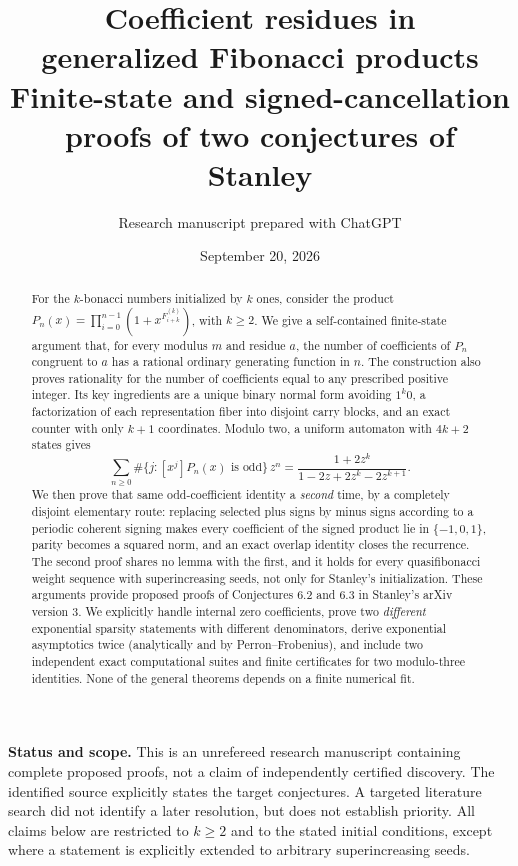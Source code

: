 \documentclass[11pt,letterpaper]{article}
\title{\vspace{-1.2em}\color{ink}\bfseries Coefficient residues in\protect\\ generalized Fibonacci products\protect\\[0.5em]
\large Finite-state and signed-cancellation proofs of two conjectures of Stanley}
\author{\normalsize Research manuscript prepared with ChatGPT}
\date{September 20, 2026}
\numberwithin{equation}{section}
\theoremstyle{definition}
\theoremstyle{remark}
\begin{document}
\maketitle
\thispagestyle{empty}
\begin{abstract}
For the $k$-bonacci numbers initialized by $k$ ones, consider the product
$P_n(x)=\prod_{i=0}^{n-1}(1+x^{F_{i+k}^{(k)}})$, with $k\ge2$.
We give a self-contained finite-state argument that, for every modulus $m$
and residue $a$, the number of coefficients of $P_n$ congruent to $a$
has a rational ordinary generating function in $n$. The construction also
proves rationality for the number of coefficients equal to any prescribed
positive integer. Its key ingredients are a unique binary normal form
avoiding $1^k0$, a factorization of each representation fiber into disjoint
carry blocks, and an exact counter with only $k+1$ coordinates. Modulo two,
a uniform automaton with $4k+2$ states gives
\[
 \sum_{n\ge0}\#\{j:[x^j]P_n(x)\text{ is odd}\}\,z^n
 =\frac{1+2z^k}{1-2z+2z^k-2z^{k+1}}.
\]
We then prove that same odd-coefficient identity a \emph{second} time, by a
completely disjoint elementary route: replacing selected plus signs by minus
signs according to a periodic coherent signing makes every coefficient of the
signed product lie in $\{-1,0,1\}$, parity becomes a squared norm, and an exact
overlap identity closes the recurrence. The second proof shares no lemma with
the first, and it holds for every quasifibonacci weight sequence with
superincreasing seeds, not only for Stanley's initialization.
These arguments provide proposed proofs of Conjectures 6.2 and 6.3 in
Stanley's arXiv version 3. We explicitly handle internal zero coefficients,
prove two \emph{different} exponential sparsity statements with different
denominators, derive exponential asymptotics twice (analytically and by
Perron--Frobenius), and include two independent exact computational suites
and finite certificates for two modulo-three identities.
None of the general theorems depends on a finite numerical fit.
\end{abstract}

\medskip
\noindent\colorbox{pale}{\parbox{\dimexpr\linewidth-2\fboxsep\relax}{
\textbf{Status and scope.} This is an unrefereed research manuscript containing
complete proposed proofs, not a claim of independently certified discovery.
The identified source explicitly states the target conjectures. A targeted
literature search did not identify a later resolution, but does not establish
priority. All claims below are restricted to $k\ge2$ and to the stated
initial conditions, except where a statement is explicitly extended to
arbitrary superincreasing seeds.}}
\end{document}

